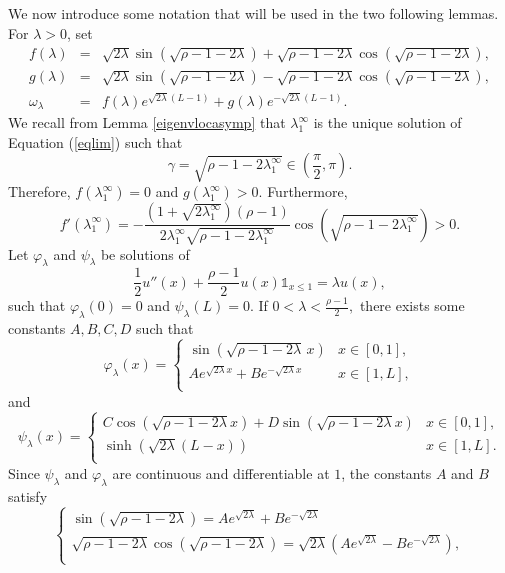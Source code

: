 \documentclass[11pt]{article}
\theoremstyle{plain}
\newcommand\linf{\lambda_1^\infty}
\begin{document}
We now introduce some notation that will be used in the two following lemmas.  For $\lambda>0$, set
\begin{eqnarray}
    f(\lambda)&=&\sqrt{2\lambda}\sin(\sqrt{\rho-1-2\lambda})+\sqrt{\rho-1-2\lambda}\cos(\sqrt{\rho-1-2\lambda})\nonumber,\\
    g(\lambda)&=&\sqrt{2\lambda}\sin(\sqrt{\rho-1-2\lambda})-\sqrt{\rho-1-2\lambda}\cos(\sqrt{\rho-1-2\lambda})\label{def:walpha},\\
    \omega_\lambda&=&f(\lambda)e^{\sqrt{2\lambda}(L-1)}+g(\lambda)e^{-\sqrt{2\lambda}(L-1)}. \nonumber
\end{eqnarray}
We recall from Lemma \ref{eigenvlocasymp} that $\linf$ is the unique solution of Equation (\ref{eqlim}) such that $$\gamma=\sqrt{\rho-1-2\linf}\in\left(\frac{\pi}{2},\pi\right).$$ Therefore, $f(\linf)=0$ and $g(\linf)>0$. Furthermore, 
 \begin{equation*}
f'(\linf)=-\frac{(1+\sqrt{2\linf})(\rho-1)}{2\linf\sqrt{\rho-1-2\linf}}\cos(\sqrt{\rho-1-2\linf})> 0.
 \end{equation*}
Let $\varphi_\lambda$ and $\psi_\lambda$ be solutions of 
$$\frac{1}{2}u''(x)+\frac{\rho-1}{2}u(x)\mathbb{1}_{x\leqslant 1}=\lambda u(x),$$
such that $\varphi_\lambda(0)=0$ and $\psi_\lambda(L)=0$.
If $0<\lambda<\frac{\rho-1}{2},$ there exists some constants $A,B,C,D$ such that 
\begin{equation*}
    \varphi_\lambda(x)=\begin{cases}
  \sin(\sqrt{\rho-1-2\lambda}\,x) & x\in [0,1],\\
  Ae^{\sqrt{2\lambda}x}+Be^{-\sqrt{2\lambda}x} & x\in[1,L],\\
    \end{cases}
    \label{vecp}
\end{equation*}
and
\begin{equation*}
    \psi_\lambda(x)=\begin{cases}
C\cos(\sqrt{\rho-1-2\lambda}x)+D\sin(\sqrt{\rho-1-2\lambda}x)& x\in [0,1],\\
   \sinh(\sqrt{2\lambda}(L-x))& x\in[1,L].\\
    \end{cases}
    \label{vecp}
\end{equation*}{}
Since $\psi_\lambda$ and $\varphi_\lambda$ are continuous and differentiable at $1$, the constants $A$ and $B$ satisfy
\begin{equation*}
\begin{cases}
\sin(\sqrt{\rho-1-2\lambda})=Ae^{\sqrt{2\lambda}}+Be^{-\sqrt{2\lambda}}\\
   \sqrt{\rho-1-2\lambda}\cos(\sqrt{\rho-1-2\lambda})=\sqrt{2\lambda}(Ae^{\sqrt{2\lambda}}-Be^{-\sqrt{2\lambda}}),\\
    \end{cases}
\end{equation*}
\end{document}
